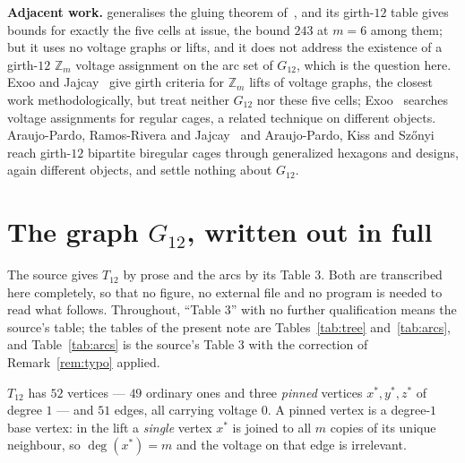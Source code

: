 \documentclass[11pt]{amsart}
\theoremstyle{remark}
\newcommand{\Zm}{\mathbb{Z}_m}
\newcommand{\Gt}{G_{12}}
\newcommand{\Tt}{T_{12}}
\begin{document}
\medskip
\noindent\textbf{Adjacent work.} \cite{GJV} generalises the gluing theorem
of~\cite{AAB}, and its girth-$12$ table gives bounds for exactly the five cells
at issue, the bound $243$ at $m = 6$ among them; but it uses no voltage graphs
or lifts, and it does not address the existence of a girth-$12$ $\Zm$ voltage
assignment on the arc set of $\Gt$, which is the question here. Exoo and
Jajcay~\cite{EJ} give girth criteria for $\Zm$ lifts of voltage graphs, the
closest work methodologically, but treat neither $\Gt$ nor these five cells;
Exoo~\cite{Exoo04} searches voltage assignments for regular cages, a related
technique on different objects. Araujo-Pardo, Ramos-Rivera and
Jajcay~\cite{ARJ} and Araujo-Pardo, Kiss and Sz\H{o}nyi~\cite{AKS} reach
girth-$12$ bipartite biregular cages through generalized hexagons and designs,
again different objects, and settle nothing about $\Gt$.

\section{The graph $\Gt$, written out in full}\label{sec:obj}

The source gives $\Tt$ by prose and the arcs by its Table 3. Both are
transcribed here completely, so that no figure, no external file and no program
is needed to read what follows. Throughout, ``Table 3'' with no further
qualification means the source's table; the tables of the present note are
Tables~\ref{tab:tree} and~\ref{tab:arcs}, and Table~\ref{tab:arcs} is the
source's Table 3 with the correction of Remark~\ref{rem:typo} applied.

$\Tt$ has $52$ vertices --- $49$ ordinary ones and three \emph{pinned} vertices
$x^*, y^*, z^*$ of degree $1$ --- and $51$ edges, all carrying voltage $0$. A
pinned vertex is a degree-$1$ base vertex: in the lift a \emph{single} vertex
$x^*$ is joined to all $m$ copies of its unique neighbour, so
$\deg(x^*) = m$ and the voltage on that edge is irrelevant.
\end{document}
